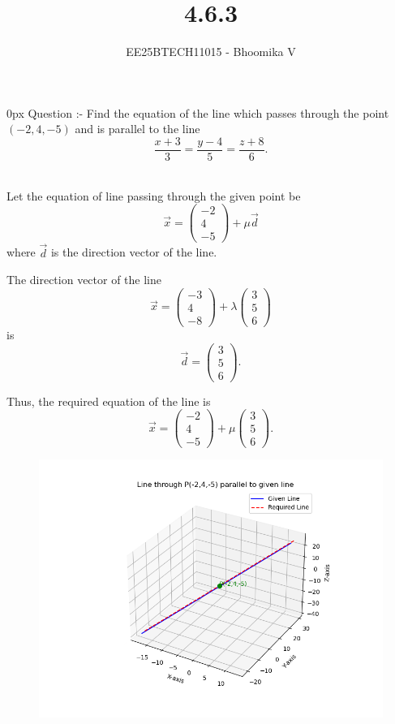 \documentclass[journal]{IEEEtran}
\begin{document}

\vspace{3cm}

\title{4.6.3}
\author{EE25BTECH11015 - Bhoomika V}
{\let\newpage\relax\maketitle}

\renewcommand{\thefigure}{\theenumi}
\renewcommand{\thetable}{\theenumi}
\setlength{\intextsep}{10pt} %


\renewcommand{\thetable}{\theenumi}
\parindent 0px 
{Question :-} 
Find the equation of the line which passes through the point $(-2,4,-5)$ and is parallel to the line
\[
\frac{x+3}{3} = \frac{y-4}{5} = \frac{z+8}{6}.
\]

\solution \\ 

Let the equation of line passing through the given point be
\[
\vec{x} = 
\begin{pmatrix}
-2 \\ 4 \\ -5
\end{pmatrix}
+ \mu \vec{d}
\]
where $\vec{d}$ is the direction vector of the line.  

The direction vector of the line 
\[
\vec{x} = 
\begin{pmatrix}
-3 \\ 4 \\ -8
\end{pmatrix}
+ \lambda
\begin{pmatrix}
3 \\ 5 \\ 6
\end{pmatrix}
\]
is
\[
\vec{d} = 
\begin{pmatrix}
3 \\ 5 \\ 6
\end{pmatrix}.
\tag{1}
\]

Thus, the required equation of the line is
\[
\vec{x} =
\begin{pmatrix}
-2 \\ 4 \\ -5
\end{pmatrix}
+ \mu 
\begin{pmatrix}
3 \\ 5 \\ 6
\end{pmatrix}.
\]
\begin{figure}[H]
\begin{center}
\includegraphics[width=0.6\columnwidth]{Figs/Fig1.png}
\end{center}
\caption{}
\label{fig:Fig.1}
\end{figure}
\end{document}
